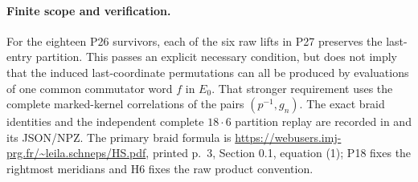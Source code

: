 \paragraph{Finite scope and verification.}
For the eighteen P26 survivors, each of the six raw lifts
in P27 preserves the last-entry partition. This passes an
explicit necessary condition, but does not imply that the
induced last-coordinate permutations can all be produced by
evaluations of one common commutator word $f$ in $E_0$.
That stronger requirement uses the complete marked-kernel
correlations of the pairs $(p^{-1},g_n)$.
The exact braid identities and the independent complete
$18\cdot6$ partition replay are recorded in
and its JSON/NPZ. The primary braid formula is
\url{https://webusers.imj-prg.fr/~leila.schneps/HS.pdf},
printed p.~3, Section 0.1, equation (1); P18 fixes the
rightmost meridians and H6 fixes the raw product convention.
